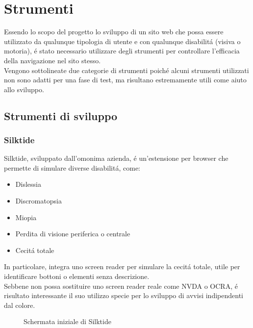\documentclass{article}
\begin{document}
\section{Strumenti}
Essendo lo scopo del progetto lo sviluppo di un sito web che possa essere utilizzato da qualunque tipologia di utente e con qualunque disabilitá (visiva o motoria), é stato necessario utilizzare degli strumenti per controllare l'efficacia della navigazione nel sito stesso.\\
Vengono sottolineate due categorie di strumenti poiché alcuni strumenti utilizzati non sono adatti per una fase di test, ma risultano estremamente utili come aiuto allo sviluppo.
\subsection{Strumenti di sviluppo}
\subsubsection*{Silktide}
Silktide, sviluppato dall'omonima azienda, é un'estensione per browser che permette di simulare diverse disabilitá, come:
\begin{itemize}
	\item Dislessia
	\item Discromatopsia
	\item Miopia
	\item Perdita di visione periferica o centrale
	\item Cecitá totale
\end{itemize}
In particolare, integra uno screen reader per simulare la cecitá totale, utile per identificare bottoni o elementi senza descrizione.\\
Sebbene non possa sostituire uno screen reader reale come NVDA o OCRA, é risultato interessante il suo utilizzo specie per lo sviluppo di avvisi indipendenti dal colore.
\begin{figure}[H]
	\centering
	\caption{Schermata iniziale di Silktide}
\end{figure}
\end{document}
